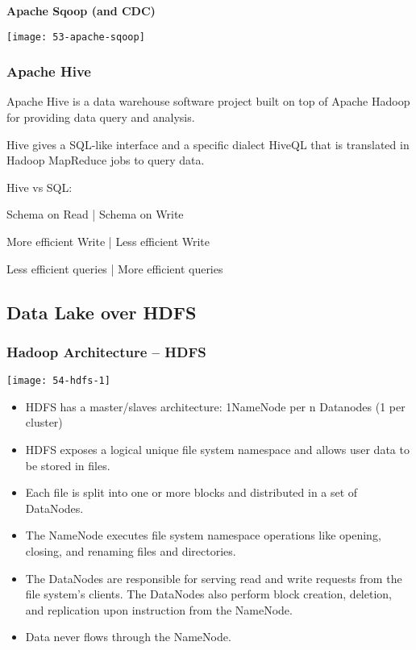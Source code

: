 \textbf{Apache Sqoop (and CDC)}

\begin{center}
\texttt{[image: 53-apache-sqoop]}
\end{center}

\subsubsection{Apache Hive}

Apache Hive is a data warehouse software project built on top of Apache Hadoop for providing data query and analysis.

Hive gives a SQL-like interface and a specific dialect HiveQL that is translated in Hadoop MapReduce jobs to query data.

Hive vs SQL:

Schema on Read         | Schema on Write

More efficient Write   | Less efficient Write

Less efficient queries | More efficient queries

\subsection{Data Lake over HDFS}

\subsubsection{Hadoop Architecture – HDFS}

\begin{center}
\texttt{[image: 54-hdfs-1]}
\end{center}

\begin{itemize}
	\item HDFS has a master/slaves architecture: 1NameNode per n Datanodes (1 per cluster)
	\item HDFS exposes a logical unique file system namespace and allows user data to be stored in files.
	\item Each file is split into one or more blocks and distributed in a set of DataNodes.
	\item The NameNode executes file system namespace operations like opening, closing, and renaming files and directories.
	\item The DataNodes are responsible for serving read and write requests from the file system’s clients. The DataNodes also perform block creation, deletion, and replication upon instruction from the NameNode.
	\item Data never flows through the NameNode.
\end{itemize}

